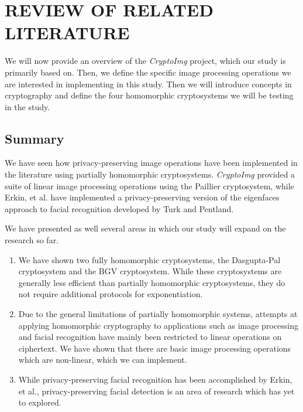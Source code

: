 \chapter{REVIEW OF RELATED LITERATURE}

We will now provide an overview of the \textit{CryptoImg} project, which our study is primarily based on. Then, we define the specific image processing operations we are interested in implementing in this study. Then we will introduce concepts in cryptography and define the four homomorphic cryptosystems we will be testing in the study.









\section{Summary}
We have seen how privacy-preserving image operations have been implemented in the literature using partially homomorphic cryptosystems. \textit{CryptoImg} provided a suite of linear image processing operations using the Paillier cryptosystem, while Erkin, et al. have implemented a privacy-preserving version of the eigenfaces approach to facial recognition developed by Turk and Pentland.

We have presented as well several areas in which our study will expand on the research so far.
\begin{enumerate}
  \item We have shown two fully homomorphic cryptosystems, the Dasgupta-Pal cryptosystem and the BGV cryptosystem. While these cryptosystems are generally less efficient than partially homomorphic cryptosystems, they do not require additional protocols for exponentiation.
  \item Due to the general limitations of partially homomorphic systems, attempts at applying homomorphic cryptography to applications such as image processing and facial recognition have mainly been restricted to linear operations on ciphertext. We have shown that there are basic image processing operations which are non-linear, which we can implement.
  \item While privacy-preserving facial recognition has been accomplished by Erkin, et al., privacy-preserving facial detection is an area of research which has yet to explored.
\end{enumerate}
